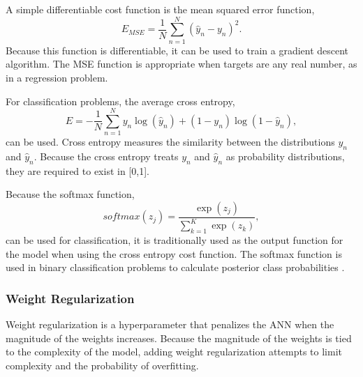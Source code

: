 A simple differentiable cost function is the mean squared error function,
%
\begin{equation} \label{eq:MSE_error}
E_{MSE} = {\frac{1} N} \sum_{n=1}^N (\hat{y}_n - y_n)^2.
\end{equation}
%
Because this function is differentiable, it can be used to train a gradient descent algorithm. The MSE function is appropriate when targets are any real number, as in a regression problem. 

For classification problems, the average cross entropy, 
%
\begin{equation} \label{eq:CrossEntropy}
E = -{\frac{1} N} \sum_{n=1}^N y_n \log(\hat{y}_n) +  (1-y_n) \log(1-\hat{y}_n), 
\end{equation}
%
can be used. Cross entropy measures the similarity between the distributions $y_n$ and $\hat{y}_n$. Because the cross entropy treats $y_n$ and $\hat{y}_n$ as probability distributions, they are required to exist in [0,1].

Because the softmax function,
%
\begin{equation} \label{eq:softmax}
softmax(z_j) = \frac{\exp(z_j)} {\sum_{k=1}^{K} \exp(z_k)},
\end{equation}
%
can be used for classification, it is traditionally used as the output function for the model when using the cross entropy cost function. The softmax function is used in binary classification problems to calculate posterior class probabilities \cite{Bridle1990}.





\subsubsection{Weight Regularization}

Weight regularization is a hyperparameter that penalizes the ANN when the magnitude of the weights increases. Because the magnitude of the weights is tied to the complexity of the model, adding weight regularization attempts to limit complexity and the probability of overfitting.

